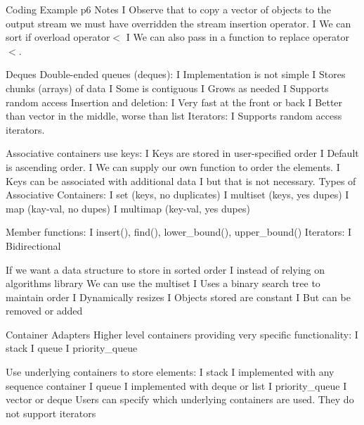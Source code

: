 \documentclass{article}
\begin{document}
{Coding Example p6 Notes
I Observe that to copy a vector of objects to the output stream we must have
overridden the stream insertion operator.
I We can sort if overload operator$<$
I We can also pass in a function to replace operator$<$.

Deques
Double-ended queues (deques):
I Implementation is not simple
I Stores chunks (arrays) of data
I Some is contiguous
I Grows as needed
I Supports random access
Insertion and deletion:
I Very fast at the front or back
I Better than vector in the middle, worse than list
Iterators:
I Supports random access iterators.


Associative containers use keys:
I Keys are stored in user-specified order
I Default is ascending order.
I We can supply our own function to order the elements.
I Keys can be associated with additional data
I but that is not necessary.
Types of Associative Containers:
I set (keys, no duplicates)
I multiset (keys, yes dupes)
I map (kay-val, no dupes)
I multimap (key-val, yes dupes)



Member functions:
I insert(), find(), lower\_bound(), upper\_bound()
Iterators:
I Bidirectional


If we want a data structure to store in sorted order
I instead of relying on algorithms library
We can use the multiset
I Uses a binary search tree to maintain order
I Dynamically resizes
I Objects stored are constant
I But can be removed or added


Container Adapters
Higher level containers providing very specific functionality:
I stack
I queue
I priority\_queue

Use underlying containers to store elements:
I stack
I implemented with any sequence container
I queue
I implemented with deque or list
I priority\_queue
I vector or deque
Users can specify which underlying containers are used.
They do not support iterators



}
\end{document}
